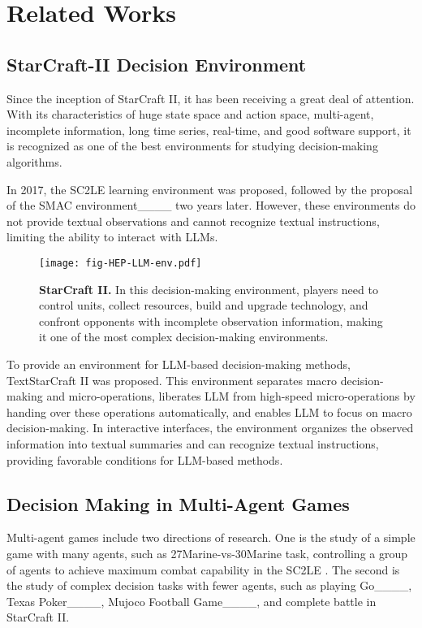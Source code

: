 \section{Related Works}
\subsection{StarCraft-II Decision Environment}
Since the inception of StarCraft II, it has been receiving a great deal of
attention. With its characteristics of huge state space and action space, multi-agent, incomplete information, long time series, real-time, and good software support, it is recognized as one of the best environments for studying decision-making algorithms. 

In 2017, the SC2LE learning environment was proposed, followed by the proposal of the SMAC environment____ two years later. However, these environments do not provide textual observations and cannot recognize textual instructions, limiting the ability to interact with LLMs.

\begin{figure}
\centerline{\texttt{[image: fig-HEP-LLM-env.pdf]}}
\caption{\textbf{StarCraft II.} In this decision-making environment, players need to control units, collect resources, build and upgrade technology, and confront opponents with incomplete observation information, making it one of the most complex decision-making environments.} 
\end{figure}

To provide an environment for LLM-based decision-making methods, TextStarCraft II was proposed. This environment separates macro decision-making and micro-operations, liberates LLM from high-speed micro-operations by handing over these operations automatically, and enables LLM to focus on macro decision-making. In interactive interfaces, the environment organizes the observed information into textual summaries and can recognize textual instructions, providing favorable conditions for LLM-based methods.

\subsection{Decision Making in Multi-Agent Games}

Multi-agent games include two directions of research. One is the study of a simple game with many agents, such as 27Marine-vs-30Marine task, controlling a group of agents to achieve maximum combat capability in the SC2LE . The second is the study of complex decision tasks with fewer agents, such as playing Go____, Texas Poker____, Mujoco Football Game____, and complete battle in StarCraft II. 

